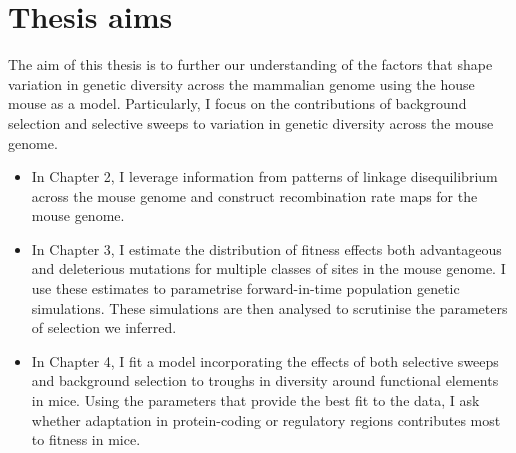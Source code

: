 \section[Thesis aims]{Thesis aims}

	The aim of this thesis is to further our understanding of the factors that shape variation in genetic diversity across the mammalian genome using the house mouse as a model. Particularly, I focus on the contributions of background selection and selective sweeps to variation in genetic diversity across the mouse genome. 

	\begin{itemize}
	
	\item In Chapter 2, I leverage information from patterns of linkage disequilibrium across the mouse genome and construct recombination rate maps for the mouse genome. 
	
	\item In Chapter 3, I estimate the distribution of fitness effects both advantageous and deleterious mutations for multiple classes of sites in the mouse genome. I use these estimates to parametrise forward-in-time population genetic simulations. These simulations are then analysed to scrutinise the parameters of selection we inferred.
	
	\item In Chapter 4, I fit a model incorporating the effects of both selective sweeps and background selection to troughs in diversity around functional elements in mice. Using the parameters that provide the best fit to the data, I ask whether adaptation in protein-coding or  regulatory regions contributes most to fitness in mice.
	
	\end{itemize}

